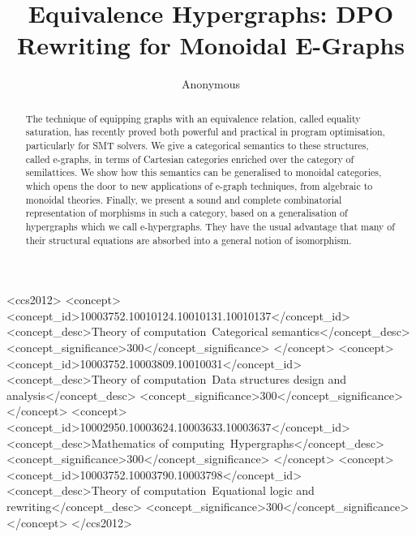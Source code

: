 \documentclass[sigconf,9pt]{acmart}
\begin{document}
\title{Equivalence Hypergraphs: DPO Rewriting for Monoidal E-Graphs}

\author{Anonymous}


\begin{abstract}
The technique of equipping graphs with an equivalence relation, called equality saturation, has recently proved both powerful and practical in program optimisation, particularly for SMT solvers. 
We give a categorical semantics to these structures, called e-graphs, in terms of Cartesian categories enriched over the category of semilattices. 
We show how this semantics can be generalised to monoidal categories, which opens the door to new applications of e-graph techniques, from algebraic to monoidal theories.
Finally, we present a sound and complete combinatorial representation of morphisms in such a category,  based on a generalisation of hypergraphs which we call e-hypergraphs.
They have the usual advantage that many of their structural equations are absorbed into a general notion of isomorphism. 
\end{abstract}


\begin{CCSXML}
<ccs2012>
   <concept>
       <concept_id>10003752.10010124.10010131.10010137</concept_id>
       <concept_desc>Theory of computation~Categorical semantics</concept_desc>
       <concept_significance>300</concept_significance>
       </concept>
   <concept>
       <concept_id>10003752.10003809.10010031</concept_id>
       <concept_desc>Theory of computation~Data structures design and analysis</concept_desc>
       <concept_significance>300</concept_significance>
       </concept>
   <concept>
       <concept_id>10002950.10003624.10003633.10003637</concept_id>
       <concept_desc>Mathematics of computing~Hypergraphs</concept_desc>
       <concept_significance>300</concept_significance>
       </concept>
   <concept>
       <concept_id>10003752.10003790.10003798</concept_id>
       <concept_desc>Theory of computation~Equational logic and rewriting</concept_desc>
       <concept_significance>300</concept_significance>
       </concept>
 </ccs2012>
\end{CCSXML}
\end{document}
